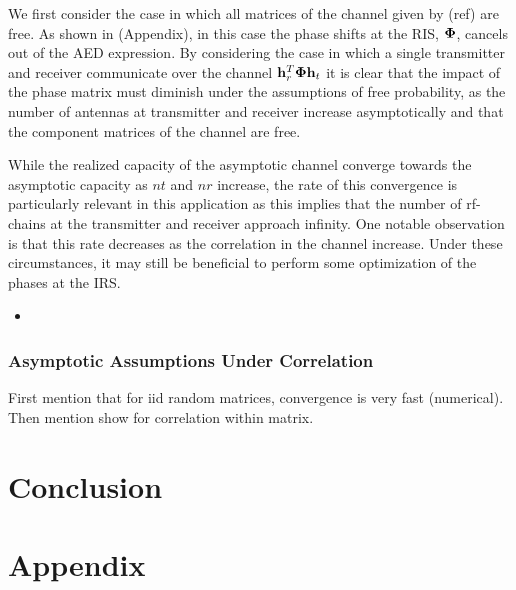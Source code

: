 \documentclass[12pt,a4paper]{report}
\begin{document}
We first consider the case in which all matrices of the channel given by (ref) are free. As shown in (Appendix), in this case the 
phase shifts at the RIS, $\boldsymbol{\Phi}$, cancels out of the AED expression. 
By considering the case in which a single transmitter and receiver communicate over the channel $\mathbf{h}_r^T \boldsymbol{\Phi} \mathbf{h}_t$ it is clear that
the impact of the phase matrix must diminish under the assumptions of free probability, \ie  as the number of antennas at transmitter and receiver increase asymptotically and that the component matrices of the channel are free. 
\par
While the realized capacity of the asymptotic channel converge towards the asymptotic capacity as $nt$ and $nr$ increase, the rate of this convergence is particularly relevant in this application as this implies that the number of rf-chains at the transmitter and receiver approach infinity. One notable observation is that this rate
decreases as the correlation in the channel increase. Under these circumstances, it may still be beneficial to perform some optimization of the phases at the IRS. 
\begin{itemize}
\item 
	
\end{itemize}
\subsection{Asymptotic Assumptions Under Correlation}
First mention that for iid random matrices, convergence is very fast (numerical). Then mention show for correlation within matrix. 

\chapter{Conclusion}
\chapter{Appendix}


\end{document}
